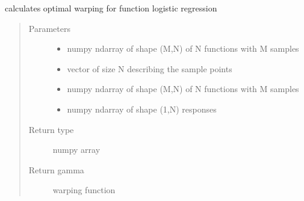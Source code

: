 \documentclass[letterpaper,10pt,english]{sphinxmanual}
\begin{document}
\begin{fulllineitems}
\label{\detokenize{regression:regression.logistic_warp}}
calculates optimal warping for function logistic regression
\begin{quote}\begin{description}
\item[{Parameters}] \leavevmode\begin{itemize}
\item {} 
 \textendash{} numpy ndarray of shape (M,N) of N functions with M samples

\item {} 
 \textendash{} vector of size N describing the sample points

\item {} 
 \textendash{} numpy ndarray of shape (M,N) of N functions with M samples

\item {} 
 \textendash{} numpy ndarray of shape (1,N) responses

\end{itemize}

\item[{Return type}] \leavevmode
numpy array

\item[{Return gamma}] \leavevmode
warping function

\end{description}\end{quote}

\end{fulllineitems}

\end{document}
